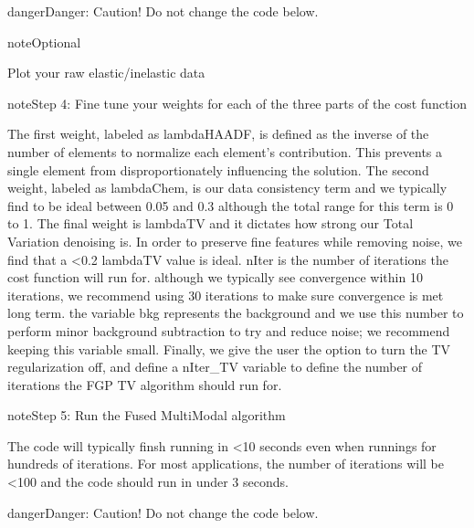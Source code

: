 \documentclass[letterpaper,10pt,english]{jupyterBook}
\begin{document}
\begin{sphinxadmonition}{danger}{Danger:}
\sphinxAtStartPar
Caution!
Do not change the code below.
\end{sphinxadmonition}

\begin{sphinxadmonition}{note}{Optional}

\sphinxAtStartPar
Plot your raw elastic/inelastic data
\end{sphinxadmonition}

\begin{sphinxadmonition}{note}{Step 4: Fine tune your weights for each of the three parts of the cost function}

\sphinxAtStartPar
The first weight, labeled as lambdaHAADF, is defined as the inverse of the number of elements to normalize each element’s contribution. This prevents a single element from disproportionately influencing the solution.  The second weight, labeled as lambdaChem, is our data consistency term and we typically find to be ideal between 0.05 and 0.3 although the total range for this term is 0 to 1. The final weight is lambdaTV and it dictates how strong our Total Variation denoising is. In order to preserve fine features while removing noise, we find that a <0.2 lambdaTV value is ideal. nIter is the number of iterations the cost function will run for. although we typically see convergence within 10 iterations, we recommend using 30 iterations to make sure convergence is met long term. the variable bkg represents the background and we use this number to perform minor background subtraction to try and reduce noise; we recommend keeping this variable small. Finally, we give the user the option to turn the TV regularization off, and define a nIter\_TV variable to define the number of iterations the FGP TV algorithm should run for.
\end{sphinxadmonition}

\begin{sphinxadmonition}{note}{Step 5: Run the Fused Multi\sphinxhyphen{}Modal algorithm}

\sphinxAtStartPar
The code will typically finsh running in <10 seconds even when runnings for hundreds of iterations.  For most applications, the number of iterations will be <100 and the code should run in under 3 seconds.
\end{sphinxadmonition}

\begin{sphinxadmonition}{danger}{Danger:}
\sphinxAtStartPar
Caution!
Do not change the code below.
\end{sphinxadmonition}
\end{document}
